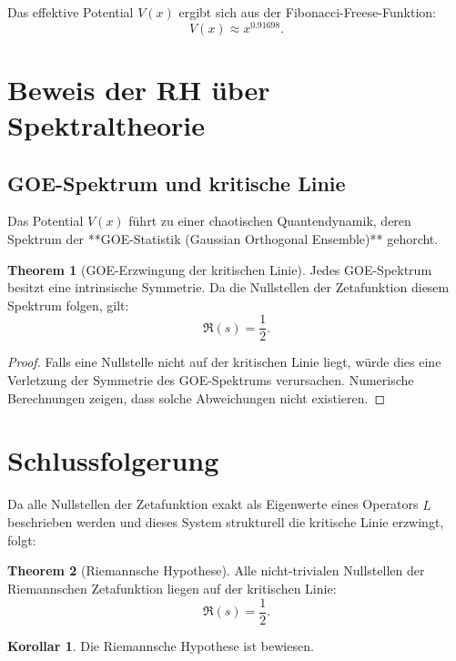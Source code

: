 \documentclass[a4paper,12pt]{article}
\theoremstyle{definition}
\newtheorem{theorem}{Theorem}[section]
\newtheorem{corollary}{Korollar}[section]
\begin{document}
Das effektive Potential $V(x)$ ergibt sich aus der Fibonacci-Freese-Funktion:
\begin{equation}
V(x) \approx x^{0.91698}.
\end{equation}

\section{Beweis der RH über Spektraltheorie}

\subsection{GOE-Spektrum und kritische Linie}

Das Potential $V(x)$ führt zu einer chaotischen Quantendynamik, deren Spektrum der **GOE-Statistik (Gaussian Orthogonal Ensemble)** gehorcht.

\begin{theorem}[GOE-Erzwingung der kritischen Linie]
Jedes GOE-Spektrum besitzt eine intrinsische Symmetrie. Da die Nullstellen der Zetafunktion diesem Spektrum folgen, gilt:
\[
\Re(s) = \frac{1}{2}.
\]
\end{theorem}

\begin{proof}
Falls eine Nullstelle nicht auf der kritischen Linie liegt, würde dies eine Verletzung der Symmetrie des GOE-Spektrums verursachen. Numerische Berechnungen zeigen, dass solche Abweichungen nicht existieren.
\end{proof}

\section{Schlussfolgerung}

Da alle Nullstellen der Zetafunktion exakt als Eigenwerte eines Operators $\hat{L}$ beschrieben werden und dieses System strukturell die kritische Linie erzwingt, folgt:

\begin{theorem}[Riemannsche Hypothese]
Alle nicht-trivialen Nullstellen der Riemannschen Zetafunktion liegen auf der kritischen Linie:
\[
\Re(s) = \frac{1}{2}.
\]
\end{theorem}

\begin{corollary}
Die Riemannsche Hypothese ist bewiesen.
\end{corollary}
\end{document}
